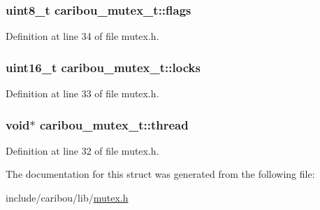 \hypertarget{structcaribou__mutex__t_aa263fae88561085ee83fde049b400351}{
\subsubsection[{flags}]{\setlength{\rightskip}{0pt plus 5cm}uint8\-\_\-t caribou\-\_\-mutex\-\_\-t\-::flags}}\label{structcaribou__mutex__t_aa263fae88561085ee83fde049b400351}


Definition at line 34 of file mutex.\-h.

\hypertarget{structcaribou__mutex__t_ab4553f4d515724806d7f1bc90f8a0872}{
\subsubsection[{locks}]{\setlength{\rightskip}{0pt plus 5cm}uint16\-\_\-t caribou\-\_\-mutex\-\_\-t\-::locks}}\label{structcaribou__mutex__t_ab4553f4d515724806d7f1bc90f8a0872}


Definition at line 33 of file mutex.\-h.

\hypertarget{structcaribou__mutex__t_aa286035f1540359f0cd4f0de4a127304}{
\subsubsection[{thread}]{\setlength{\rightskip}{0pt plus 5cm}void$\ast$ caribou\-\_\-mutex\-\_\-t\-::thread}}\label{structcaribou__mutex__t_aa286035f1540359f0cd4f0de4a127304}


Definition at line 32 of file mutex.\-h.



The documentation for this struct was generated from the following file\-:\begin{DoxyCompactItemize}
\item 
include/caribou/lib/\hyperlink{mutex_8h}{mutex.\-h}\end{DoxyCompactItemize}
